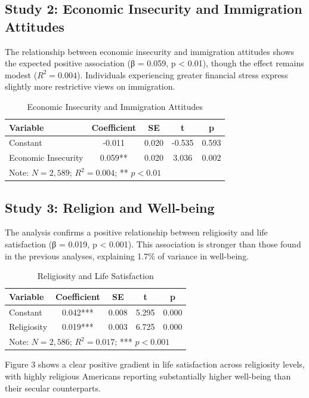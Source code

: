 \documentclass[12pt,a4paper]{article}
\begin{document}
\subsection{Study 2: Economic Insecurity and Immigration Attitudes}

The relationship between economic insecurity and immigration attitudes shows the 
expected positive association (β = 0.059, p < 0.01), though the effect remains 
modest ($R^2 = 0.004$). Individuals experiencing greater financial stress express 
slightly more restrictive views on immigration.

\begin{table}[h]
\centering
\caption{Economic Insecurity and Immigration Attitudes}
\begin{tabular}{lcccc}
\toprule
Variable & Coefficient & SE & t & p \\
\midrule
Constant & -0.011 & 0.020 & -0.535 & 0.593 \\
Economic Insecurity & 0.059** & 0.020 & 3.036 & 0.002 \\
\bottomrule
\multicolumn{5}{l}{\footnotesize Note: $N = 2,589$; $R^2 = 0.004$; ** $p < 0.01$}
\end{tabular}
\end{table}

\subsection{Study 3: Religion and Well-being}

The analysis confirms a positive relationship between religiosity and life 
satisfaction (β = 0.019, p < 0.001). This association is stronger than those 
found in the previous analyses, explaining 1.7\% of variance in well-being.

\begin{table}[h]
\centering
\caption{Religiosity and Life Satisfaction}
\begin{tabular}{lcccc}
\toprule
Variable & Coefficient & SE & t & p \\
\midrule
Constant & 0.042*** & 0.008 & 5.295 & 0.000 \\
Religiosity & 0.019*** & 0.003 & 6.725 & 0.000 \\
\bottomrule
\multicolumn{5}{l}{\footnotesize Note: $N = 2,586$; $R^2 = 0.017$; *** $p < 0.001$}
\end{tabular}
\end{table}

Figure 3 shows a clear positive gradient in life satisfaction across religiosity 
levels, with highly religious Americans reporting substantially higher well-being 
than their secular counterparts.
\end{document}
